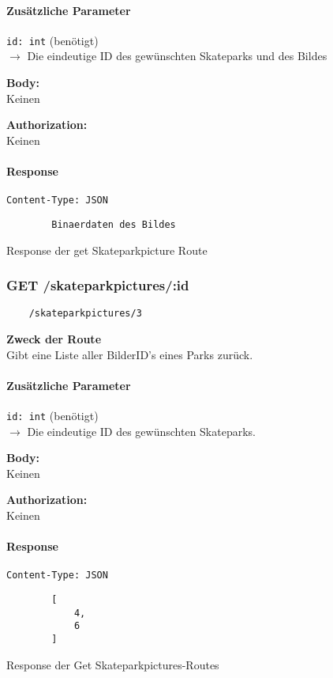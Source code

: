 \paragraph{Zusätzliche Parameter}
\lstinline{id: int} (benötigt) \\
$\rightarrow$ Die eindeutige ID des gewünschten Skateparks und des Bildes


\textbf{Body:} \\
Keinen

\textbf{Authorization:} \\
Keinen

\paragraph{Response }
\begin{code}
    \lstinline{Content-Type: JSON}
    \begin{lstlisting}
        Binaerdaten des Bildes
    \end{lstlisting}
    \caption{Response der get Skateparkpicture Route}
\end{code}
\pagebreak

\subsubsection{GET /skateparkpictures/:id}

\begin{lstlisting}
    /skateparkpictures/3
\end{lstlisting}

\textbf{Zweck der Route} \\
Gibt eine Liste aller BilderID's eines Parks zurück.




\paragraph{Zusätzliche Parameter}
\lstinline{id: int} (benötigt) \\
$\rightarrow$ Die eindeutige ID des gewünschten Skateparks.


\textbf{Body:} \\
Keinen

\textbf{Authorization:} \\
Keinen

\paragraph{Response }
\begin{code}
    \lstinline{Content-Type: JSON}
    \begin{lstlisting}
        [
            4,
            6    
        ]
    \end{lstlisting}
    \caption{Response der Get Skateparkpictures-Routes}
\end{code}

